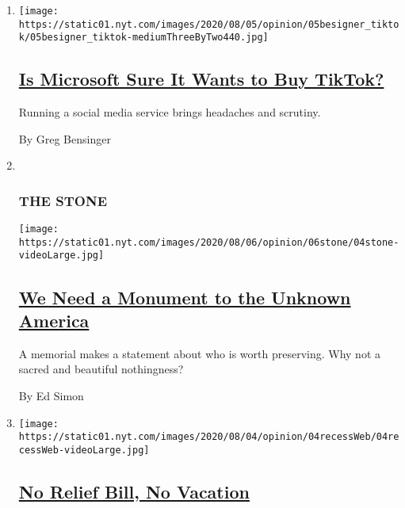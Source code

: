 \begin{enumerate}
\def\labelenumi{\arabic{enumi}.}
\item
  \texttt{[image: https://static01.nyt.com/images/2020/08/05/opinion/05besigner\_tiktok/05besigner\_tiktok-mediumThreeByTwo440.jpg]}

  \hypertarget{is-microsoft-sure-it-wants-to-buy-tiktok}{%
  \subsection{\texorpdfstring{\href{/2020/08/04/opinion/tiktok-microsoft-trump.html}{Is
  Microsoft Sure It Wants to Buy
  TikTok?}}{Is Microsoft Sure It Wants to Buy TikTok?}}\label{is-microsoft-sure-it-wants-to-buy-tiktok}}

  Running a social media service brings headaches and scrutiny.

  By Greg Bensinger
\item ~
  \hypertarget{the-stone}{%
  \subsubsection{THE STONE}\label{the-stone}}

  \texttt{[image: https://static01.nyt.com/images/2020/08/06/opinion/06stone/04stone-videoLarge.jpg]}

  \hypertarget{we-need-a-monument-to-the-unknown-america}{%
  \subsection{\texorpdfstring{\href{/2020/08/04/opinion/us-monuments-rome-unknown-god.html}{We
  Need a Monument to the Unknown
  America}}{We Need a Monument to the Unknown America}}\label{we-need-a-monument-to-the-unknown-america}}

  A memorial makes a statement about who is worth preserving. Why not a
  sacred and beautiful nothingness?

  By Ed Simon
\item
  \texttt{[image: https://static01.nyt.com/images/2020/08/04/opinion/04recessWeb/04recessWeb-videoLarge.jpg]}

  \hypertarget{no-relief-bill-no-vacation}{%
  \subsection{\texorpdfstring{\href{/2020/08/04/opinion/coronavirus-relief-bill-senate-recess.html}{No
  Relief Bill, No
  Vacation}}{No Relief Bill, No Vacation}}\label{no-relief-bill-no-vacation}}


\end{enumerate}

